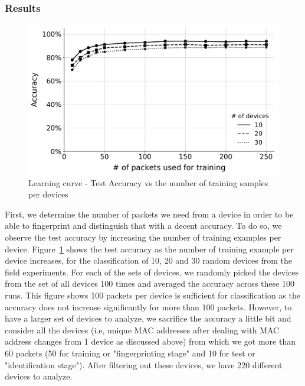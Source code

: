 \subsubsection*{Results}

\begin{figure}
    \centering
    \includegraphics[width = \linewidth]{plots/learning_curve.pdf}
    \caption{Learning curve - Test Accuracy vs the number of training samples per devices}
    \label{fig:14}
\end{figure}

First, we determine the number of packets we need from a device in
order to be able to fingerprint and distinguish that with a decent accuracy. To
do so, we observe the test accuracy by increasing the number of training
examples per device. Figure~\ref{fig:14} shows the test accuracy as the number
of training example per device increases, for the classification of 10, 20 and
30 random devices from the field experiments. For each of the sets of devices,
we randomly picked the devices from the set of all devices 100 times and
averaged the accuracy across these 100 runs. This figure shows 100 packets per
device is sufficient for classification as the accuracy does not increase
significantly for more than 100 packets. However, to have a larger set of
devices to analyze, we sacrifice the accuracy a little bit and consider all the
devices (i.e, unique MAC addresses after dealing with MAC address changes from
1 device as discussed above) from which we got more than 60 packets (50 for
training or "fingerprinting stage" and 10 for test or "identification stage").
After filtering out these devices, we have 220 different devices to analyze.

